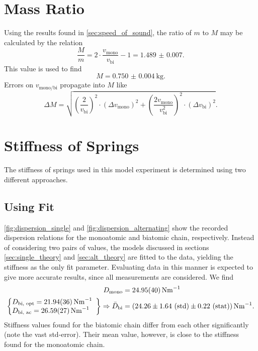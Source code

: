 \section{Mass Ratio}
Using the results found in \autoref{sec:speed_of_sound}, the ratio of $m$ to $M$ may be calculated by the relation
\begin{equation*}
	\frac{M}{m} = 2\cdot\frac{v_\text{mono}}{v_\text{bi}} -1 = \num{1.489(7)}.
\end{equation*}
This value is used to find
\begin{equation*}
	M = \SI{0.750(4)}{\kg}.
\end{equation*}
Errors on $v_\text{mono/bi}$ propagate into $M$ like
\begin{equation*}
	\Delta M = \sqrt{ \left(\frac{2}{v_\text{bi}}\right)^2 \cdot (\Delta v_\text{mono})^2 + \left(\frac{2v_\text{mono}}{v_\text{bi}^2}\right)^2 \cdot (\Delta v_\text{bi})^2 }.
\end{equation*}

\section{Stiffness of Springs}
The stiffness of springs used in this model experiment is determined using two different approaches.

\subsection{Using Fit}
\autoref{fig:dispersion_single} and \autoref{fig:dispersion_alternating} show the recorded dispersion relations for the monoatomic and biatomic chain, respectively.
Instead of considering two pairs of values, the models discussed in sections \ref{sec:single_theory} and \ref{sec:alt_theory} are fitted to the data, yielding the stiffness as the only fit parameter.
Evaluating data in this manner is expected to give more accurate results, since all measurements are considered.
We find
\begin{align*}
	D_\text{mono} &= \SI{24.95(40)}{\newton\meter^{-1}} \\
	\left\{ \begin{array}{@{}ll@{}}
		D_\text{bi, opt} = \SI{21.94(36)}{\newton\meter^{-1}} \\
		D_\text{bi, ac} = \SI{26.59(27)}{\newton\meter^{-1}}
	\end{array}\right\} \Rightarrow \bar{D}_\text{bi} &= \left(\num{24.26}\pm \num{1.64}\ \text{(std)}\pm \num{0.22}\ \text{(stat)}\right)\si{\newton\meter^{-1}}.
\end{align*}
Stiffness values found for the biatomic chain differ from each other significantly (note the vast std-error).
Their mean value, however, is close to the stiffness found for the monoatomic chain.

